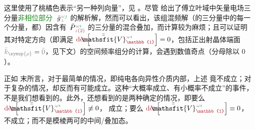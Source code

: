这里使用了\textcolor{Peach}{桃橘色}表示“另一种列向量”，见 。尽管  给出了傅立叶域中矢量电场三分量\textcolor{ForestGreen}{非相位部分} $\Xint{{}^{}_{\mathcolor{gray}{-}}}{10}{\bar{g}}^{\;\!\mathcolor{gray}{\omega} \textcolor{ForestGreen}{\jmath}}_{\;\! \mathcolor{gray}{z}}$ 的解析解，然而可以看出，该组混频解（的三分量中的每一个分量，都）因含有 $\Xint{\mathcolor{gray}{-}}{24}{\bar{P}}^{\;\! \mathcolor{gray}{\omega} \textcolor{ForestGreen}{\imath}}_{\;\! \mathcolor{gray}{z} \textcolor{Maroon}{(2)}}$ 的三分量的混合叠加，而计算较为麻烦；且可以证明其对特定方向（即满足 $\textcolor{Maroon}{\det} \left[ \Xint{\mathcolor{gray}{-}}{25}{\bar{\bar{\mathsfit{V}}}}^{\;\! \mathcolor{gray}{\omega} \textcolor{ForestGreen}{\imath}}_{\textcolor{Maroon}{\mathbb{1}}} \right] = 0$，包括正出射晶体端面 $\mathcolor{gray}{\bar{k}_{\symup{\rho}}} = \mathcolor{gray}{\bar{0}}$，见下文）的空间频率组分的计算，会遇到数值奇点（分母除以 $0$）。

正如  末所言，对于最简单的情况，即纯电各向异性介质内部，上述  竟不成立；对于复杂的情况，却反而有可能成立。这种“大概率成立、有小概率不成立”的事件，不是我们想看到的。此外，还想看到的是两种确定的情况，即要么 $\textcolor{Maroon}{\det} \left[ \Xint{\mathcolor{gray}{-}}{25}{\bar{\bar{\mathsfit{V}}}}^{\;\! \mathcolor{gray}{\omega} \textcolor{ForestGreen}{\imath}}_{\textcolor{Maroon}{\mathbb{1}}} \right] \not\equiv 0$， 成立；要么 $\textcolor{Maroon}{\det} \left[ \Xint{\mathcolor{gray}{-}}{25}{\bar{\bar{\mathsfit{V}}}}^{\;\! \mathcolor{gray}{\omega} \textcolor{ForestGreen}{\imath}}_{\textcolor{Maroon}{\mathbb{1}}} \right] \equiv 0$， 不成立；而不是模棱两可的中间/叠加态。

